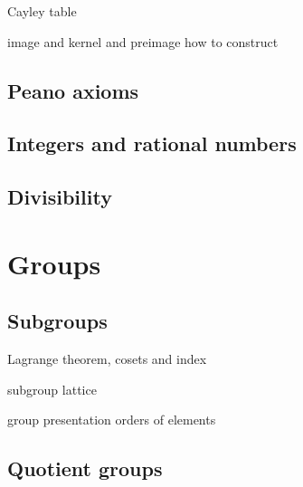 \documentclass{../../large}
\begin{document}
Cayley table


\begin{prb}[Homomorphisms]
image and kernel and preimage
how to construct
\end{prb}


\section{Peano axioms}

\section{Integers and rational numbers}

\section{Divisibility}






\chapter{Groups}

\section{Subgroups}

\begin{prb}[Subgroups]
Lagrange theorem, cosets and index

subgroup lattice
\end{prb}

\begin{prb}[Generators]
group presentation
orders of elements
\end{prb}




\section{Quotient groups}
\begin{prb}
\end{prb}

\begin{prb}
\end{prb}

\begin{prb}
\end{prb}
\end{document}

